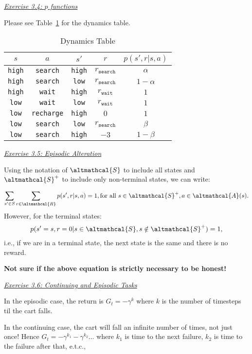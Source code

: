 \documentclass{article}
\newcommand{\myq}[1]{%
	\vspace{1em}
	\noindent\underline{\emph{Exercise #1}}\vspace{0.25em}\linebreak
}
\begin{document}
\myq{3.4: $p$ functions}
Please see Table~\ref{tab:example} for the dynamics table. 
\begin{table}[H]
	\caption{\label{tab:example}Dynamics Table}
	\begin{tabular}{cccc|c}
		$s$           & $a$             & $s'$          & $r$ & $p(s', r| s, a)$ \\ \hline
		\texttt{high} & \texttt{search} & \texttt{high} & $r_{\texttt{search}}$ &  $\alpha$                \\
		\texttt{high} & \texttt{search} & \texttt{low} & $r_{\texttt{search}}$ &     $1 - \alpha$             \\
		\texttt{high} & \texttt{wait} & \texttt{high} & $r_{\texttt{wait}}$ &     $1$             \\
		\texttt{low} & \texttt{wait} & \texttt{low} & $r_{\texttt{wait}}$ &     $1$             \\
		\texttt{low} & \texttt{recharge} & \texttt{high} & $0$ &     $1$             \\
		\texttt{low} & \texttt{search} & \texttt{low} & $r_{\texttt{search}}$ &     $\beta$             \\
		\texttt{low} & \texttt{search} & \texttt{high} & $-3$ &     $1-\beta$             \\           
	\end{tabular}
\centering
\end{table}

\myq{3.5: Episodic Alteration}
Using the notation of $\altmathcal{S}$ to include all states and $\altmathcal{S}^+$ to include only non-terminal states, we can write:

\begin{align}
\sum_{s' \in S} \sum_{r \in \altmathcal{R}} p(s', r | s, a) = 1, \text{for all } s\in \altmathcal{S}^+, a \in \altmathcal{A}(s).
\end{align}
However, for the terminal states:
\begin{align}
p(s' = s, r = 0| s \in \altmathcal{S}, s\notin \altmathcal{S}^+) = 1,
\end{align}
i.e., if we are in a terminal state, the next state is the same and there is no reward. 

\textbf{Not sure if the above equation is strictly necessary to be honest!}

\myq{3.6: Continuing and Episodic Tasks}
In the episodic case, the return is $G_t = -\gamma^k$ where $k$ is the number of timesteps til the cart falls. 

In the continuing case, the cart will fall an infinite number of times, not just once! Hence $G_t = -\gamma^{k_1} -\gamma^{k_2} \dots$ where $k_1$ is time to the next failure, $k_2$ is time to the failure after that, e.t.c.,
\end{document}
